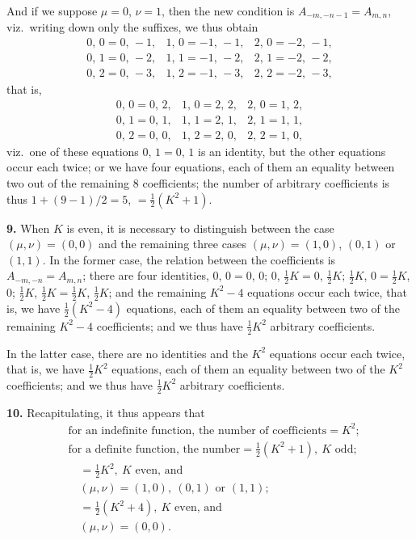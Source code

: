 \documentclass[11pt]{article}
\begin{document}
And if we suppose $\mu=0$, $\nu=1$, then the new condition is $A_{-m,-n-1}=A_{m,n}$, viz.\ writing down only the suffixes, we thus obtain
\[
\begin{array}{lll}
0,\,0=0,\,-1, & 1,\,0=-1,\,-1, & 2,\,0=-2,\,-1,\\
0,\,1=0,\,-2, & 1,\,1=-1,\,-2, & 2,\,1=-2,\,-2,\\
0,\,2=0,\,-3, & 1,\,2=-1,\,-3, & 2,\,2=-2,\,-3,
\end{array}
\]
that is,
\[
\begin{array}{lll}
0,\,0=0,\,2, & 1,\,0=2,\,2, & 2,\,0=1,\,2,\\
0,\,1=0,\,1, & 1,\,1=2,\,1, & 2,\,1=1,\,1,\\
0,\,2=0,\,0, & 1,\,2=2,\,0, & 2,\,2=1,\,0,
\end{array}
\]
viz.\ one of these equations $0,\,1=0,\,1$ is an identity, but the other equations occur each twice; or we have four equations, each of them an equality between two out of the remaining 8 coefficients; the number of arbitrary coefficients is thus $1+(9-1)/2=5$, $=\tfrac{1}{2}(K^{2}+1)$.

\medskip
\noindent\textbf{9.} When $K$ is even, it is necessary to distinguish between the case $(\mu,\nu)=(0,0)$ and the remaining three cases $(\mu,\nu)=(1,0)$, $(0,1)$ or $(1,1)$. In the former case, the relation between the coefficients is $A_{-m,-n}=A_{m,n}$; there are four identities, $0$, $0=0$, $0$; $0$, $\tfrac{1}{2}K=0$, $\tfrac{1}{2}K$; $\tfrac{1}{2}K$, $0=\tfrac{1}{2}K$, $0$; $\tfrac{1}{2}K$, $\tfrac{1}{2}K=\tfrac{1}{2}K$, $\tfrac{1}{2}K$; and the remaining $K^{2}-4$ equations occur each twice, that is, we have $\tfrac{1}{2}(K^{2}-4)$ equations, each of them an equality between two of the remaining $K^{2}-4$ coefficients; and we thus have $\tfrac{1}{2}K^{2}$ arbitrary coefficients.

In the latter case, there are no identities and the $K^{2}$ equations occur each twice, that is, we have $\tfrac{1}{2}K^{2}$ equations, each of them an equality between two of the $K^{2}$ coefficients; and we thus have $\tfrac{1}{2}K^{2}$ arbitrary coefficients.

\medskip
\noindent\textbf{10.} Recapitulating, it thus appears that
\begin{align*}
&\text{for an indefinite function, the number of coefficients}=K^{2};\\
&\text{for a definite function, the number}=\tfrac{1}{2}(K^{2}+1),\ K\text{ odd};\\
&\quad{}=\tfrac{1}{2}K^{2},\ K\text{ even, and}\\
&\quad(\mu,\nu)=(1,0),\ (0,1)\text{ or }(1,1);\\
&\quad{}=\tfrac{1}{2}(K^{2}+4),\ K\text{ even, and}\\
&\quad(\mu,\nu)=(0,0).
\end{align*}
\end{document}
